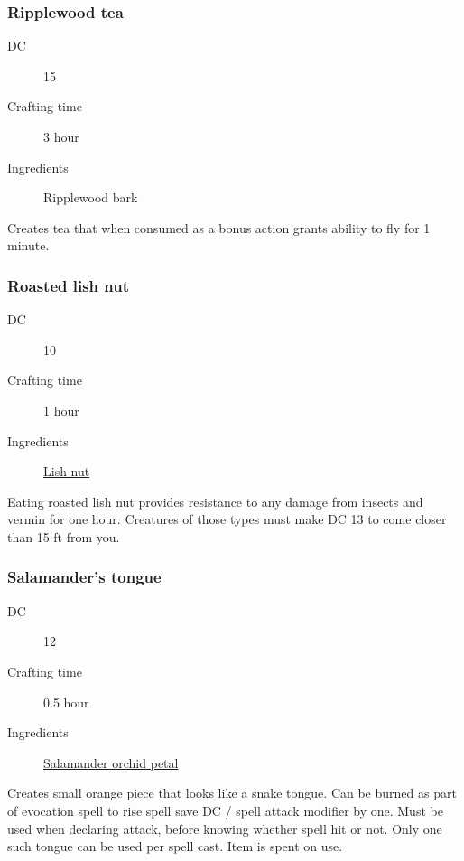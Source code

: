 \subsubsection{Ripplewood tea}
\label{Ripplewood tea}

\begin{description}
\item [DC] 15 \arcana
\item [Crafting time] 3 hour
\item [Ingredients] Ripplewood bark
\end{description}

Creates tea that when consumed as a bonus action grants ability to fly for 1 minute.

\subsubsection{Roasted lish nut}
\label{Roasted lish nut}

\begin{description}
\item [DC] 10 \survival
\item [Crafting time] 1 hour
\item [Ingredients] \hyperref[Lish]{Lish nut}
\end{description}

Eating roasted lish nut provides resistance to any damage from insects and vermin for one hour. 
Creatures of those types must make DC 13 \wisdomsave to come closer than 15 ft from you.

\subsubsection{Salamander's tongue}
\label{Salamander's tongue}

\begin{description}
\item [DC] 12 \arcana
\item [Crafting time] 0.5 hour
\item [Ingredients] \hyperref[Salamander Orchid]{Salamander orchid petal}
\end{description}

Creates small orange piece that looks like a snake tongue. 
Can be burned as part of evocation spell to rise  spell save DC / spell attack modifier by one. Must be used when declaring attack, before knowing whether spell hit or not. Only one such tongue can be used per spell cast. Item is spent on use.

